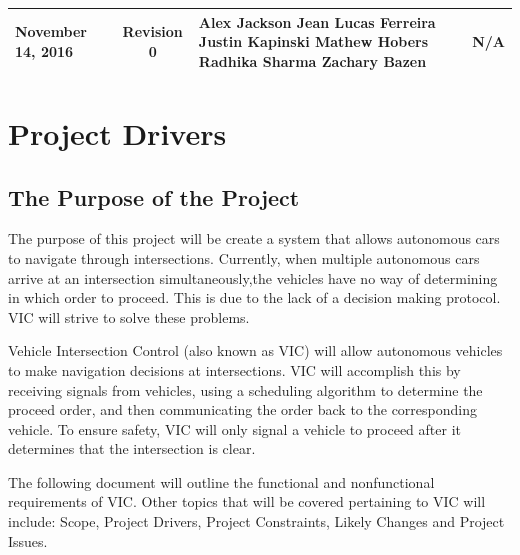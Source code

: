 \documentclass [11pt]{article}
\begin{document}
\begin{longtable}{| p{ } | p{ } | p{ } | p{ } |}
%
\multirow{5}{*}{\centering November 14, 2016}  & 
\multicolumn{1}{c|}{\multirow{5}{*}{Revision 0}}& 
{Alex Jackson \newline
Jean Lucas Ferreira \newline
Justin Kapinski\newline
Mathew Hobers\newline
Radhika Sharma\newline
Zachary Bazen}
&
 \multicolumn{1}{c|}{\multirow{5}{*}{N/A}} \\ 
\hline 




\end{longtable}
\pagebreak



\section {\textbf{Project Drivers}}


\subsection{The Purpose of the Project} 

The purpose of this project will be create a system that allows autonomous cars to navigate through  intersections. Currently, when multiple autonomous cars arrive at an intersection simultaneously,the vehicles have no way of determining in which order to proceed. This is due to the lack of a decision making protocol. VIC will strive to solve these problems.  \newline


Vehicle Intersection Control (also known as VIC) will allow autonomous vehicles to make navigation decisions at intersections. VIC will accomplish this by receiving signals from vehicles, using a scheduling algorithm to determine the proceed order, and then communicating the order back to the corresponding vehicle. To ensure safety, VIC will only signal a vehicle to proceed after it determines that the intersection is clear. \newline

The following document will outline the functional and nonfunctional requirements of VIC.  Other topics that will be covered pertaining to VIC will include: Scope, Project Drivers, Project Constraints, Likely Changes and Project Issues.
\end{document}
